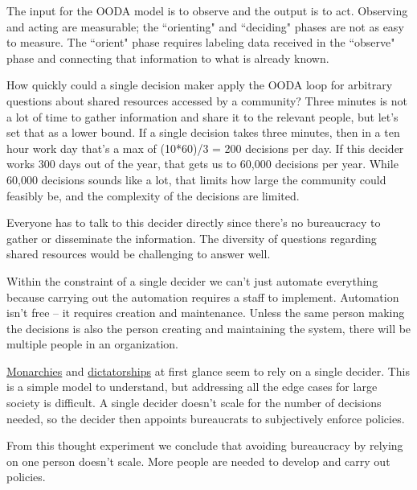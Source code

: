 The input for the OODA model is to observe and the output is to act. Observing and acting are measurable; the ``orienting" and ``deciding" phases are not as easy to measure. The ``orient" phase requires labeling data received in the ``observe" phase and connecting that information to what is already known.

How quickly could a single decision maker apply the OODA loop for arbitrary questions about \glspl{shared resource} accessed by a community? Three minutes is not a lot of time to gather information and share it to the relevant people, but let's set that as a lower bound.
If a single decision takes three minutes, then in a ten hour work day that's a max of (10*60)/3 = 200 decisions per day. If this decider works 300 days out of the year, that gets us to 60,000 decisions per year. While 60,000 decisions sounds like a lot, that limits how large the community could feasibly be, and the complexity of the decisions are limited. 

Everyone has to talk to this decider directly since there's no bureaucracy to gather or disseminate the information. The diversity of questions regarding shared resources would be challenging to answer well.

Within the constraint of a single decider we can't just automate everything because carrying out the automation requires a staff to implement. 
Automation isn't free -- it requires creation and maintenance. Unless the same person making the decisions is also the person creating and maintaining the system, there will be multiple people in an organization.


\href{https://en.wikipedia.org/wiki/Monarchy}{Monarchies} 
and 
\href{https://en.wikipedia.org/wiki/Dictator}{dictatorships}
at first glance seem to rely on a single decider. This is a simple model to understand, but addressing all the edge cases for large society is difficult. A single decider doesn't scale for the number of decisions needed, so the decider then appoints bureaucrats to subjectively enforce policies. 

From this thought experiment we conclude that avoiding bureaucracy by relying on one person doesn't scale. More people are needed to develop and carry out policies. 




